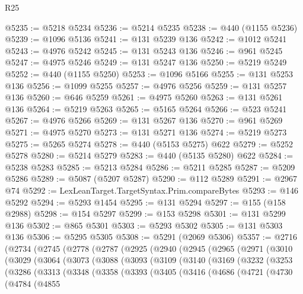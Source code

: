 \begin{lexlean}{R25}
\begin{coremodule}
@5235 := @5218 @5234
@5236 := @5214 @5235
@5238 := @440 (@1155 @5236)
@5239 := @1096 @5136
@5241 := @131 @5239 @136
@5242 := @1012 @5241
@5243 := @4976 @5242
@5245 := @131 @5243 @136
@5246 := @961 @5245
@5247 := @4975 @5246
@5249 := @131 @5247 @136
@5250 := @5219 @5249
@5252 := @440 (@1155 @5250)
@5253 := @1096 @5166
@5255 := @131 @5253 @136
@5256 := @1099 @5255
@5257 := @4976 @5256
@5259 := @131 @5257 @136
@5260 := @646 @5259
@5261 := @4975 @5260
@5263 := @131 @5261 @136
@5264 := @5219 @5263
@5265 := @5165 @5264
@5266 := @523 @5241
@5267 := @4976 @5266
@5269 := @131 @5267 @136
@5270 := @961 @5269
@5271 := @4975 @5270
@5273 := @131 @5271 @136
@5274 := @5219 @5273
@5275 := @5265 @5274
@5278 := @440 (@5153 @5275) @622
@5279 := @5252 @5278
@5280 := @5214 @5279
@5283 := @440 (@5135 @5280) @622
@5284 := @5238 @5283
@5285 := @5213 @5284
@5286 := @5211 @5285
@5287 := @5209 @5286
@5289 := @5087 (@5207 @5287)
@5290 := @112 @5289
@5291 := @2967 @74
@5292 := LexLeanTarget.TargetSyntax.Prim.compareBytes
@5293 := @146 @5292
@5294 := @5293 @1454
@5295 := @131 @5294
@5297 := @155 (@158 @2988)
@5298 := @154 @5297
@5299 := @153 @5298
@5301 := @131 @5299 @136
@5302 := @865 @5301
@5303 := @5293 @5302
@5305 := @131 @5303 @136
@5306 := @5295 @5305
@5308 := @5291 (@2069 @5306)
@5357 := @2716
    (@2734
      (@2745
        (@2778
          (@2787
            (@2925
              (@2940
                (@2945
                  (@2965
                    (@2971
                      (@3010
                        (@3029
                          (@3064
                            (@3073
                              (@3088
                                (@3093
                                  (@3109
                                    (@3140
                                      (@3169
                                        (@3232
                                          (@3253
                                            (@3286
                                              (@3313
                                                (@3348
                                                  (@3358
                                                    (@3393
                                                      (@3405
                                                        (@3416
                                                          (@4686
                                                            (@4721
                                                              (@4730
                                                                (@4784
                                                                  (@4855

\end{coremodule}
\end{lexlean}
